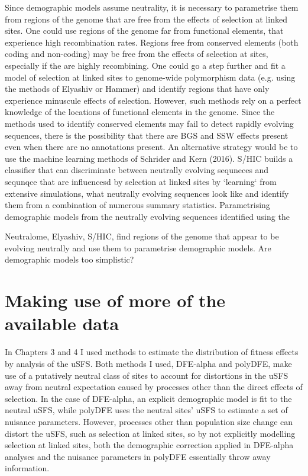 	Since demographic models assume neutrality, it is necessary to parametrise them from regions of the genome that are free from the effects of selection at linked sites. One could use regions of the genome far from functional elements, that experience high recombination rates. Regions free from conserved elements (both coding and non-coding) may be free from the effects of selection at sites, especially if the are highly recombining. One could go a step further and fit a model of selection at linked sites to genome-wide polymorphism data (e.g. using the methods of Elyashiv or Hammer) and identify regions that have only experience minuscule  effects of selection. However, such methods rely on a perfect knowledge of the locations of functional elements in the genome. Since the methods used to identify conserved elements may fail to detect rapidly evolving sequences, there is the possibility that there are BGS and SSW effects present even when there are no annotations present. An alternative strategy would be to use the machine learning methods of Schrider and Kern (2016). S/HIC builds a classifier that can discriminate between neutrally evolving sequneces and sequnqce that are influencesd by selection at linked sites by `learning` from extensive simulations, what neutrally evolving sequences look like and identify them from a combination of numerous summary statistics. Parametrising demographic models from the neutrally evolving sequences identified using the 

Neutralome, Elyashiv, S/HIC, find regions of the genome that appear to be evolving neutrally and use them to parametrise demographic models. Are demographic models too simplistic?

\section{Making use of more of the available data}

In Chapters 3 and 4 I used methods to estimate the distribution of fitness effects by analysis of the uSFS. Both methods I used, DFE-alpha and polyDFE, make use of a putatively neutral class of sites to account for distortions in the uSFS away from neutral expectation caused by processes other than the direct effects of selection. In the case of DFE-alpha, an explicit demographic model is fit to the neutral uSFS, while polyDFE uses the neutral sites' uSFS to estimate a set of  nuisance parameters.  However, processes other than population size change can distort the uSFS, such as selection at linked sites, so by not explicitly modelling selection at linked sites, both the demographic correction applied in DFE-alpha analyses and the nuisance parameters in polyDFE essentially throw away information. 

